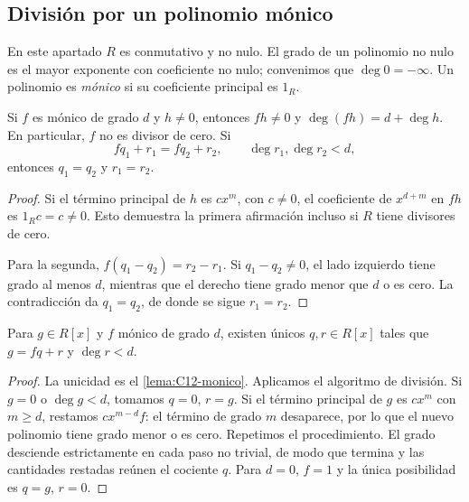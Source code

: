 \subsection{División por un polinomio mónico}\label{tema:12-3-3}
En este apartado $R$ es conmutativo y no nulo. El grado de un polinomio no nulo es el mayor exponente con coeficiente no nulo; convenimos que $\deg0=-\infty$. Un polinomio es \emph{mónico} si su coeficiente principal es $1_R$.

\begin{lema}\label{lema:C12-monico}
Si $f$ es mónico de grado $d$ y $h\ne0$, entonces $fh\ne0$ y $\deg(fh)=d+\deg h$. En particular, $f$ no es divisor de cero. Si
\[
fq_1+r_1=fq_2+r_2,\qquad \deg r_1,\deg r_2<d,
\]
entonces $q_1=q_2$ y $r_1=r_2$.
\end{lema}
\begin{proof}
Si el término principal de $h$ es $cx^m$, con $c\ne0$, el coeficiente de $x^{d+m}$ en $fh$ es $1_Rc=c\ne0$. Esto demuestra la primera afirmación incluso si $R$ tiene divisores de cero.

Para la segunda, $f(q_1-q_2)=r_2-r_1$. Si $q_1-q_2\ne0$, el lado izquierdo tiene grado al menos $d$, mientras que el derecho tiene grado menor que $d$ o es cero. La contradicción da $q_1=q_2$, de donde se sigue $r_1=r_2$.
\end{proof}


\begin{prop}\label{prop:C12-division}
Para $g\in R[x]$ y $f$ mónico de grado $d$, existen únicos $q,r\in R[x]$ tales que $g=fq+r$ y $\deg r<d$.
\end{prop}
\begin{proof}
La unicidad es el \cref{lema:C12-monico}. Aplicamos el algoritmo de división. Si $g=0$ o $\deg g<d$, tomamos $q=0$, $r=g$. Si el término principal de $g$ es $cx^m$ con $m\geq d$, restamos $cx^{m-d}f$: el término de grado $m$ desaparece, por lo que el nuevo polinomio tiene grado menor o es cero. Repetimos el procedimiento. El grado desciende estrictamente en cada paso no trivial, de modo que termina y las cantidades restadas reúnen el cociente $q$. Para $d=0$, $f=1$ y la única posibilidad es $q=g$, $r=0$.
\end{proof}


